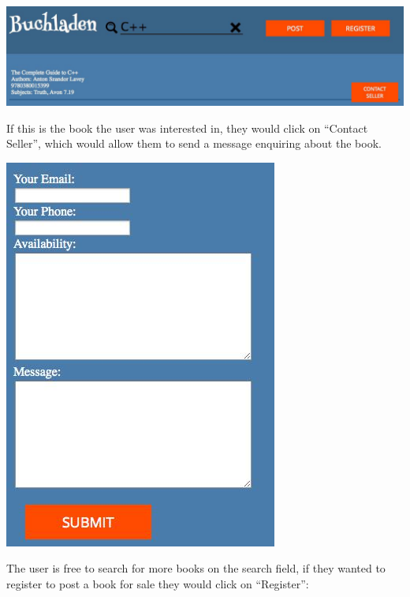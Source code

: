 \documentclass[11pt]{article}
\begin{document}
\vspace{0.2in}

\centerline{\includegraphics[scale=0.3]{./images/search.jpg}}

\vspace{0.1in}

If this is the book the user was interested in, they would click on
``Contact Seller'', which would allow them to send a message enquiring
about the book.

\vspace{0.2in}

\centerline{\includegraphics[scale=0.7]{./images/contact-seller.jpg}}

\vspace{0.1in}

The user is free to search for more books on the search field, if they
wanted to register to post a book for sale they would click on
``Register'':

\vspace{0.2in}
\end{document}
